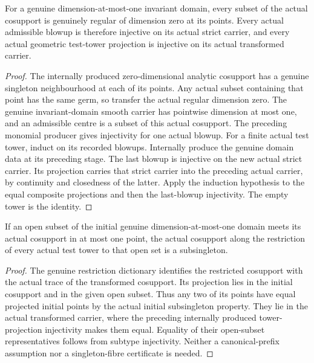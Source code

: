 \begin{theorem}
\label{hir:curve-domain-projection-injectivity}
\leanok
For a genuine dimension-at-most-one invariant domain, every subset of the
actual cosupport is genuinely regular of dimension zero at its points.
Every actual admissible blowup is therefore injective on its actual strict
carrier, and every actual geometric test-tower projection is injective on
its actual transformed carrier.
\end{theorem}
\begin{proof}
The internally produced zero-dimensional analytic cosupport has a genuine
singleton neighbourhood at each of its points. Any actual subset containing
that point has the same germ, so transfer the actual regular dimension zero.
The genuine invariant-domain smooth carrier has pointwise dimension at most
one, and an admissible centre is a subset of this actual cosupport. The
preceding monomial producer gives injectivity for one actual blowup.
For a finite actual test tower, induct on its recorded blowups. Internally
produce the genuine domain data at its preceding stage. The last blowup is
injective on the new actual strict carrier. Its projection carries that
strict carrier into the preceding actual carrier, by continuity and closedness
of the latter. Apply the induction hypothesis to the equal composite
projections and then the last-blowup injectivity. The empty tower is the identity.
\end{proof}

\begin{theorem}
\label{hir:curve-singleton-open-cosupport-all-test-towers}
\leanok
If an open subset of the initial genuine dimension-at-most-one domain meets
its actual cosupport in at most one point, the actual cosupport along the
restriction of every actual test tower to that open set is a subsingleton.
\end{theorem}
\begin{proof}
The genuine restriction dictionary identifies the restricted cosupport with
the actual trace of the transformed cosupport. Its projection lies in the
initial cosupport and in the given open subset. Thus any two of its points
have equal projected initial points by the actual initial subsingleton property.
They lie in the actual transformed carrier, where the preceding internally
produced tower-projection injectivity makes them equal. Equality of their
open-subset representatives follows from subtype injectivity. Neither a
canonical-prefix assumption nor a singleton-fibre certificate is needed.
\end{proof}

